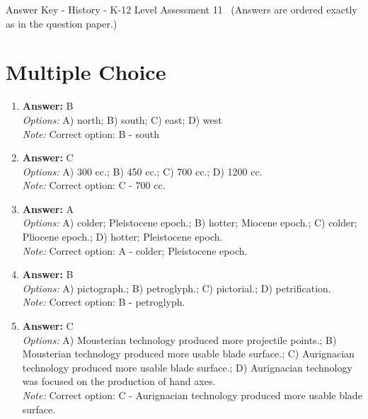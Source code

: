 \documentclass[12pt]{article}
\begin{document}
\begin{center}
Answer Key - History - K-12 Level Assessment 11 \
\small (Answers are ordered exactly as in the question paper.)
\end{center}

\section*{Multiple Choice}
\begin{enumerate}[label=\arabic*.]
\item \textbf{Answer:} B
\\ \textit{Options:} A) north; B) south; C) east; D) west
\\ \textit{Note:} Correct option: B - south
\item \textbf{Answer:} C
\\ \textit{Options:} A) 300 cc.; B) 450 cc.; C) 700 cc.; D) 1200 cc.
\\ \textit{Note:} Correct option: C - 700 cc.
\item \textbf{Answer:} A
\\ \textit{Options:} A) colder; Pleistocene epoch.; B) hotter; Miocene epoch.; C) colder; Pliocene epoch.; D) hotter; Pleistocene epoch.
\\ \textit{Note:} Correct option: A - colder; Pleistocene epoch.
\item \textbf{Answer:} B
\\ \textit{Options:} A) pictograph.; B) petroglyph.; C) pictorial.; D) petrification.
\\ \textit{Note:} Correct option: B - petroglyph.
\item \textbf{Answer:} C
\\ \textit{Options:} A) Mousterian technology produced more projectile points.; B) Mousterian technology produced more usable blade surface.; C) Aurignacian technology produced more usable blade surface.; D) Aurignacian technology was focused on the production of hand axes.
\\ \textit{Note:} Correct option: C - Aurignacian technology produced more usable blade surface.
\end{enumerate}
\end{document}
